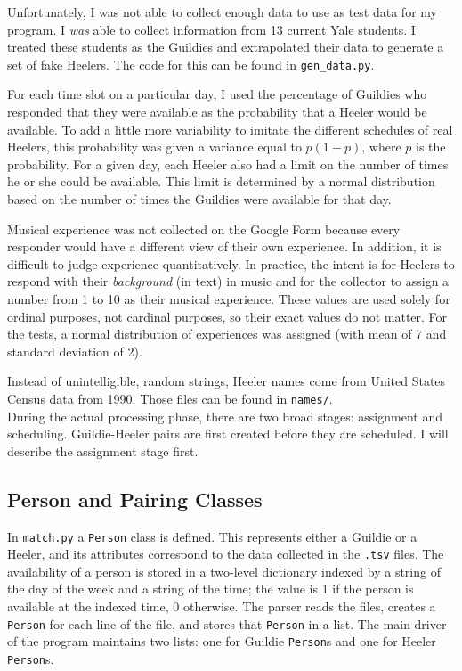 \documentclass[letterpaper]{article}
\begin{document}
Unfortunately, I was not able to collect enough data to use as test data for my program. I \textit{was} able to collect
information from 13 current Yale students. I treated these students as the Guildies and extrapolated their data to
generate a set of fake Heelers. The code for this can be found in \texttt{gen\_data.py}.

For each time slot on a particular day, I used the percentage of Guildies who responded that they were available as the
probability that a Heeler would be available. To add a little more variability to imitate the different schedules of
real Heelers, this probability was given a variance equal to $p(1-p)$, where $p$ is the probability. For a given day,
each Heeler also had a limit on the number of times he or she could be available. This limit is determined by a normal
distribution based on the number of times the Guildies were available for that day.

Musical experience was not collected on the Google Form because every responder would have a different view of their own
experience. In addition, it is difficult to judge experience quantitatively.
In practice, the intent is for Heelers to respond with their \textit{background} (in text) in music and for the
collector to assign a number from 1 to 10 as their musical experience. These values are used solely for ordinal
purposes, not cardinal purposes, so their exact values do not matter. For the tests, a normal distribution of
experiences was assigned (with mean of 7 and standard deviation of 2).

Instead of unintelligible, random strings, Heeler names come from United States Census data from 1990. Those files can
be found in \texttt{names/}.\\

During the actual processing phase, there are two broad stages: assignment and scheduling. Guildie-Heeler pairs are
first created before they are scheduled. I will describe the assignment stage first.

\subsection{Person and Pairing Classes}
In \texttt{match.py} a \texttt{Person} class is defined. This represents either a Guildie or a Heeler, and its
attributes correspond to the data collected in the \texttt{.tsv} files. The availability of a person is stored in
a two-level dictionary indexed by a string of the day of the week and a string of the time; the value is 1 if the person
is available at the indexed time, 0 otherwise. The parser reads the files, creates a
\texttt{Person} for each line of the file, and stores that \texttt{Person} in a list. The main driver of the program
maintains two lists: one for Guildie \texttt{Person}s and one for Heeler \texttt{Person}s.
\end{document}
